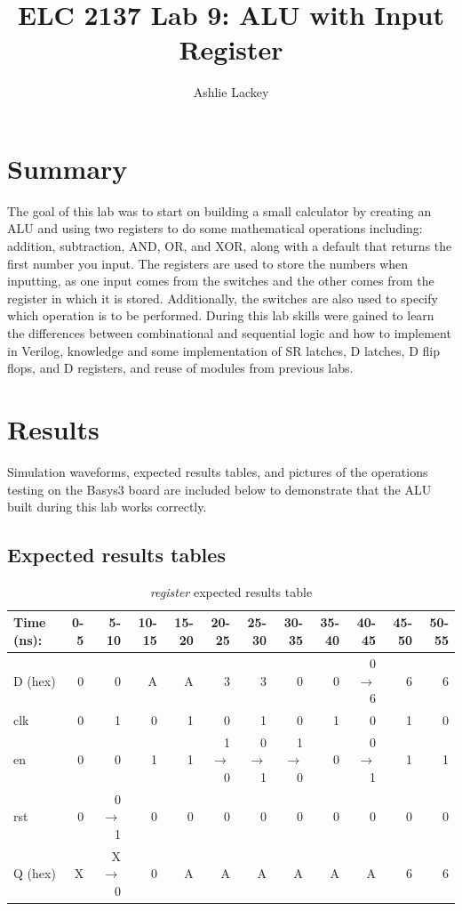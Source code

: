 \documentclass[11pt]{article}
\begin{document}
\title{ELC 2137 Lab 9: ALU with Input Register}
\author{Ashlie Lackey}

\maketitle


\section*{Summary}

The goal of this lab was to start on building a small calculator by creating an ALU and using two registers to do some mathematical operations including: addition, subtraction, AND, OR, and XOR, along with a default that returns the first number you input. The registers are used to store the numbers when inputting, as one input comes from the switches and the other comes from the register in which it is stored. Additionally, the switches are also used to specify which operation is to be performed. During this lab skills were gained to learn the differences between combinational and sequential logic and how to implement in Verilog, knowledge and some implementation of SR latches, D latches, D flip flops, and D registers, and reuse of modules from previous labs. 

\section*{Results}

Simulation waveforms, expected results tables, and pictures of the operations testing on the Basys3 board are included below to demonstrate that the ALU built during this lab works correctly.

\subsection*{Expected results tables}
\begin{table}[ht]\centering
	\caption{\textit{register} expected results table}
	\label{ALU:tbl:register_ERT}\medskip
	\begin{tabular}{l|rrrrrrrrrrr}
		Time (ns): & 0-5 & 5-10 & 10-15 & 15-20 & 20-25 & 25-30 & 30-35 & 35-40& 40-45 & 45-50 & 50-55 \\
		\midrule
		D (hex) & 0 & 0     & A & A & 3         & 3       & 0           & 0 & 0$\to$6 & 6 & 6 \\
		clk     & 0 & 1     & 0 & 1 & 0         & 1       & 0           & 1 & 0   & 1 & 0 \\
		en    & 0 & 0       & 1 & 1 & 1$\to$0 & 0$\to$1 & 1$\to$0 & 0 & 0$\to$1& 1 & 1 \\
		rst   & 0 & 0$\to$1 & 0 & 0 & 0          & 0     & 0       & 0 & 0  & 0 & 0 \\
		\midrule
		Q (hex) & X & X$\to$0 & 0 & A & A & A & A & A & A & 6 & 6 \\
		\bottomrule
	\end{tabular}
\end{table}
\end{document}
